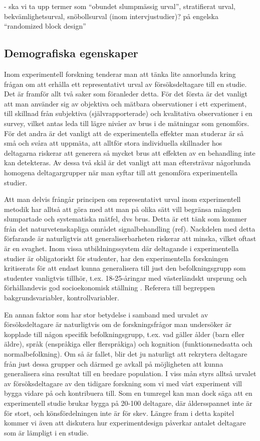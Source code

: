\documentclass[
]{book}
\begin{document}
- ska vi ta upp termer som ``obundet slumpmässig urval'', stratifierat urval, bekvämlighetsurval, snöbollsurval (inom intervjustudier)? på engelska ``randomized block design''

\hypertarget{sub07.2.2}{%
\subsection{Demografiska egenskaper}\label{sub07.2.2}}

Inom experimentell forskning tenderar man att tänka lite annorlunda kring frågan om att erhålla ett representativt urval av försöksdeltagare till en studie. Det är framför allt två saker som föranleder detta. För det första är det vanligt att man använder sig av objektiva och mätbara observationer i ett experiment, till skillnad från subjektiva (självrapporterade) och kvalitativa observationer i en survey, vilket antas leda till lägre nivåer av brus i de mätningar som genomförs. För det andra är det vanligt att de experimentella effekter man studerar är så små och svåra att uppmäta, att alltför stora individuella skillnader hos deltagarna riskerar att generera så mycket brus att effekten av en behandling inte kan detekteras. Av dessa två skäl är det vanligt att man eftersträvar någorlunda homogena deltagargrupper när man syftar till att genomföra experimentella studier.

Att man delvis frångår principen om representativt urval inom experimentell metodik har alltså att göra med att man på olika sätt vill begränsa mängden slumpartade och systematiska mätfel, dvs brus. Detta är ett tänk som kommer från det naturvetenskapliga området signalbehandling (ref). Nackdelen med detta förfarande är naturligtvis att generaliserbarheten riskerar att minska, vilket oftast är en svaghet. Inom vissa utbildningssystem där deltagande i experimentella studier är obligatoriskt för studenter, har den experimentella forskningen kritiserats för att endast kunna generalisera till just den befolkningsgrupp som studenter vanligtvis tillhör, t.ex. 18-25-åringar med västerländskt ursprung och förhållandevis god socioekonomisk ställning \citep{henrich2010weirdest}. Referera till begreppen bakgrundsvariabler, kontrollvariabler.

En annan faktor som har stor betydelse i samband med urvalet av försöksdeltagare är naturligtvis om de forskningsfrågor man undersöker är kopplade till någon specifik befolkningsgrupp, t.ex. vad gäller ålder (barn eller äldre), språk (enspråkiga eller flerspråkiga) och kognition (funktionsnedsatta och normalbefolkning). Om så är fallet, blir det ju naturligt att rekrytera deltagare från just dessa grupper och därmed ge avkall på möjligheten att kunna generalisera sina resultat till en bredare population. I viss mån styrs alltså urvalet av försöksdeltagare av den tidigare forskning som vi med vårt experiment vill bygga vidare på och kontribuera till. Som en tumregel kan man dock säga att en experimentell studie brukar bygga på 20-100 deltagare, där åldersspannet inte är för stort, och könsfördelningen inte är för skev. Längre fram i detta kapitel kommer vi även att diskutera hur experimentdesign påverkar antalet deltagare som är lämpligt i en studie.
\end{document}
